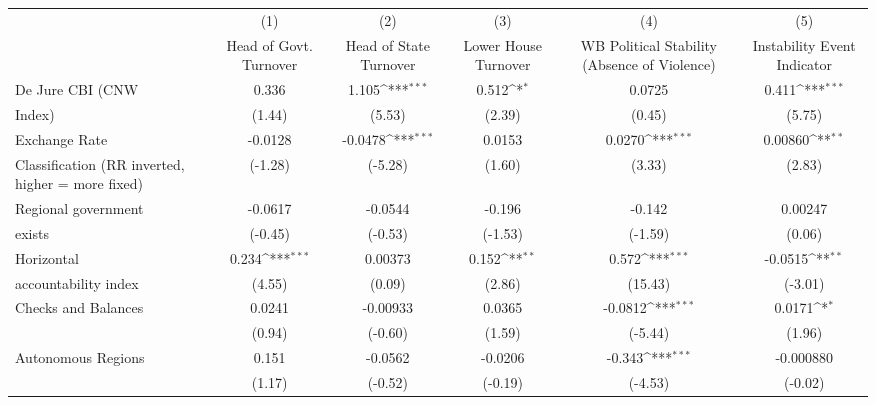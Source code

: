 {
\def\sym#1{\ifmmode^{#1}\else\(^{#1}\)\fi}
\begin{tabular}{l*{5}{c}}
\hline\hline
                    &\multicolumn{1}{c}{(1)}&\multicolumn{1}{c}{(2)}&\multicolumn{1}{c}{(3)}&\multicolumn{1}{c}{(4)}&\multicolumn{1}{c}{(5)}\\
                    &\multicolumn{1}{c}{Head of Govt. Turnover}&\multicolumn{1}{c}{Head of State Turnover}&\multicolumn{1}{c}{Lower House Turnover}&\multicolumn{1}{c}{WB Political Stability (Absence of Violence)}&\multicolumn{1}{c}{Instability Event Indicator}\\
\hline
De Jure CBI (CNW    &       0.336         &       1.105\sym{***}&       0.512\sym{*}  &      0.0725         &       0.411\sym{***}\\
Index)              &      (1.44)         &      (5.53)         &      (2.39)         &      (0.45)         &      (5.75)         \\
[1em]
Exchange Rate       &     -0.0128         &     -0.0478\sym{***}&      0.0153         &      0.0270\sym{***}&     0.00860\sym{**} \\
Classification (RR inverted, higher = more fixed)&     (-1.28)         &     (-5.28)         &      (1.60)         &      (3.33)         &      (2.83)         \\
[1em]
Regional government &     -0.0617         &     -0.0544         &      -0.196         &      -0.142         &     0.00247         \\
exists              &     (-0.45)         &     (-0.53)         &     (-1.53)         &     (-1.59)         &      (0.06)         \\
[1em]
Horizontal          &       0.234\sym{***}&     0.00373         &       0.152\sym{**} &       0.572\sym{***}&     -0.0515\sym{**} \\
accountability index&      (4.55)         &      (0.09)         &      (2.86)         &     (15.43)         &     (-3.01)         \\
[1em]
Checks and Balances &      0.0241         &    -0.00933         &      0.0365         &     -0.0812\sym{***}&      0.0171\sym{*}  \\
                    &      (0.94)         &     (-0.60)         &      (1.59)         &     (-5.44)         &      (1.96)         \\
[1em]
Autonomous Regions  &       0.151         &     -0.0562         &     -0.0206         &      -0.343\sym{***}&   -0.000880         \\
                    &      (1.17)         &     (-0.52)         &     (-0.19)         &     (-4.53)         &     (-0.02)         \\

\end{tabular}}
